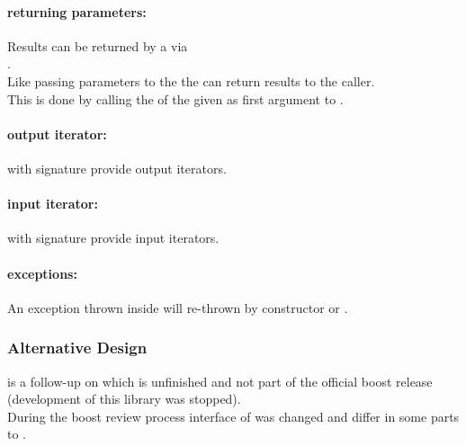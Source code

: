 \paragraph*{returning parameters:}
Results can be returned by a \corofunction via\\\coroop.\\
\newline
Like passing parameters to the \corofunction the \corofunction can return
results to the caller.\\ This is done by calling the \coroop of the \coro given
as first argument to \corofunction.

\paragraph*{output iterator:}
\coro with signature  provide output iterators.

\paragraph*{input iterator:}
\coro with signature  provide input iterators.

\paragraph*{exceptions:}
An exception thrown inside \corofunction will re-thrown by \coro constructor or
\coroop.

\subsubsection*{Alternative Design}
\boostcoroutine is a follow-up on \boostcorosum which is unfinished and
not part of the official boost release (development of this library was
stopped).\\
During the boost review process interface of \boostcoroutine was changed and
differ in some parts to \boostcorosum.
